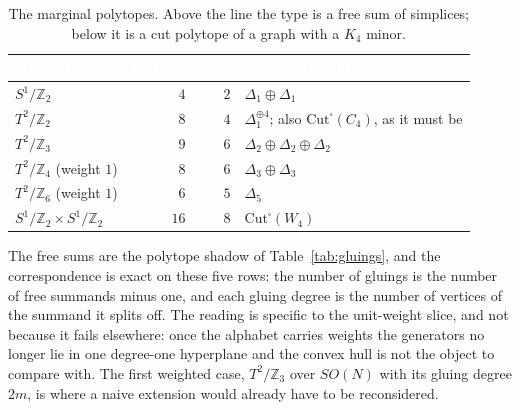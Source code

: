 \documentclass[11pt,a4paper]{article}
\theoremstyle{definition}
\newcommand{\ZZ}{\mathbb{Z}}
\newcommand{\so}[1]{SO(#1)}
\begin{document}
\begin{table}[h]
\centering\small
\begin{tabular}{lrrl}
\toprule
\rowcolor{hdrblue}
\textcolor{white}{orbifold} & \textcolor{white}{vertices} & \textcolor{white}{$\dim$} &
\textcolor{white}{combinatorial type}\\
\midrule
$S^1/\ZZ_2$ & $4$ & $2$ & $\Delta_1\oplus\Delta_1$\\
\rowcolor{softgrey}
$T^2/\ZZ_2$ & $8$ & $4$ & $\Delta_1^{\oplus4}$; also $\mathrm{Cut}^\square(C_4)$, as it must be\\
$T^2/\ZZ_3$ & $9$ & $6$ & $\Delta_2\oplus\Delta_2\oplus\Delta_2$\\
\rowcolor{softgrey}
$T^2/\ZZ_4$ (weight $1$) & $8$ & $6$ & $\Delta_3\oplus\Delta_3$\\
$T^2/\ZZ_6$ (weight $1$) & $6$ & $5$ & $\Delta_5$\\
\midrule
\rowcolor{softgrey}
$S^1/\ZZ_2\times S^1/\ZZ_2$ & $16$ & $8$ & $\mathrm{Cut}^\square(W_4)$\\
\bottomrule
\end{tabular}
\caption{The marginal polytopes. Above the line the type is a free sum of simplices; below it is a
cut polytope of a graph with a $K_4$ minor.}
\label{tab:polytopes}
\end{table}

The free sums are the polytope shadow of Table~\ref{tab:gluings}, and the correspondence is exact on
these five rows: the number of gluings is the number of free summands minus one, and each gluing
degree is the number of vertices of the summand it splits off. The reading is specific to the
unit-weight slice, and not because it fails elsewhere: once the alphabet carries weights the
generators no longer lie in one degree-one hyperplane and the convex hull is not the object to
compare with. The first weighted case, $T^2/\ZZ_3$ over $\so N$ with its gluing degree $2m$, is
where a naive extension would already have to be reconsidered.

\end{document}
